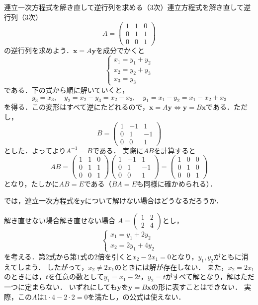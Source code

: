 \begin{example}{連立一次方程式を解き直して逆行列を求める（3次）}{連立方程式を解き直して逆行列（3次）}
  \[
    A = \begin{pmatrix} 1 & 1 & 0 \\ 0 & 1 & 1 \\ 0 & 0 & 1 \end{pmatrix}
  \]
  の逆行列を求めよう．$\bm{x} = A\bm{y}$を成分でかくと
  \[
    \begin{cases}
      x_1 = y_1 + y_2 \\
      x_2 = y_2 + y_3 \\
      x_3 = y_3
    \end{cases}
  \]
  である．下の式から順に解いていくと，
  \[
    y_3 = x_3, \quad
    y_2 = x_2 - y_3 = x_2 - x_3, \quad
    y_1 = x_1 - y_2 = x_1 - x_2 + x_3
  \]
  を得る．この変形はすべて逆にたどれるので，$\bm{x} = A\bm{y} \iff \bm{y} = B\bm{x}$である．ただし，
  \[
    B = \begin{pmatrix} 1 & -1 & 1 \\ 0 & 1 & -1 \\ 0 & 0 & 1 \end{pmatrix}
  \]
  とした．よってより$A^{-1} = B$である．
  実際に$AB$を計算すると
  \[
    AB =
    \begin{pmatrix} 1 & 1 & 0 \\ 0 & 1 & 1 \\ 0 & 0 & 1 \end{pmatrix}
    \begin{pmatrix} 1 & -1 & 1 \\ 0 & 1 & -1 \\ 0 & 0 & 1 \end{pmatrix}
    =
    \begin{pmatrix} 1 & 0 & 0 \\ 0 & 1 & 0 \\ 0 & 0 & 1 \end{pmatrix}
  \]
  となり，たしかに$AB = E$である（$BA = E$も同様に確かめられる）．
\end{example}

では，連立一次方程式を$\bm{y}$について解けない場合はどうなるだろうか．

\begin{example}{解き直せない場合}{解き直せない場合}
  $A = \begin{pmatrix} 1 & 2 \\ 2 & 4 \end{pmatrix}$とし，
  \[
    \begin{cases}
      x_1 = y_1 + 2y_2 \\
      x_2 = 2y_1 + 4y_2
    \end{cases}
  \]
  を考える．第$2$式から第$1$式の$2$倍を引くと$x_2 - 2x_1 = 0$となり，$y_1,y_2$がともに消えてしまう．
  したがって，$x_2 \ne 2x_1$のときには解が存在しない．
  また，$x_2 = 2x_1$のときには，$t$を任意の数として$y_1 = x_1 - 2t$，$y_2 = t$がすべて解となり，解はただ一つに定まらない．
  いずれにしても$\bm{y}$を$\bm{y} = B\bm{x}$の形に表すことはできない．
  実際，この$A$は$1 \cdot 4 - 2 \cdot 2 = 0$を満たし，の公式は使えない．
\end{example}

